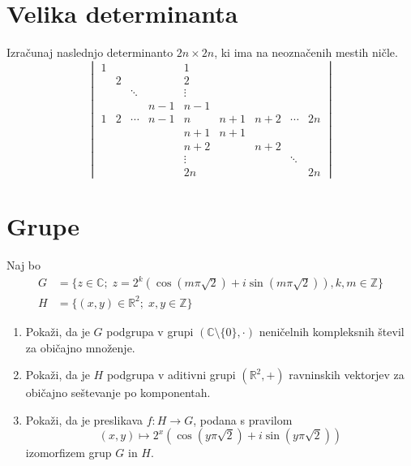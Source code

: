 \documentclass[a4paper,12pt]{article}
\begin{document}
\section*{Velika determinanta}

Izračunaj naslednjo determinanto \(2n \times 2n\), ki ima na neoznačenih mestih ničle.
\[
  \begin{vmatrix}
    1 &   &        &       & 1     &       &       &        &    \\
      & 2 &        &       & 2     &       &       &        &    \\
      &   & \ddots &       & \vdots &       &       &        &    \\
      &   &        & n-1   & n-1   &       &       &        &    \\
    1 & 2 & \cdots & n-1   & n     & n+1   & n+2   & \cdots & 2n \\
      &   &        &       & n+1   & n+1   &       &        &    \\
      &   &        &       & n+2   &       & n+2   &        &    \\
      &   &        &       & \vdots &       &       & \ddots &    \\
      &   &        &       & 2n    &       &       &        & 2n
  \end{vmatrix}
\]

\section*{Grupe}

Naj bo
\begin{align*}
  G &= \{z \in \mathbb{C};\; z = 2^k (\cos(m \pi \sqrt{2}) + i \sin(m \pi \sqrt{2})), k, m \in \mathbb{Z}\} \\
  H &= \{(x, y) \in \mathbb{R}^2;\; x, y \in \mathbb{Z}\}
\end{align*}
\begin{enumerate}
\item
Pokaži, da je \(G\) podgrupa v grupi \((\mathbb{C} \setminus \{0\}, \cdot)\)
neničelnih kompleksnih števil za običajno množenje.

\item
Pokaži, da je \(H\) podgrupa v aditivni grupi \((\mathbb{R}^2, +)\)
ravninskih vektorjev za običajno seštevanje po komponentah.

\item
Pokaži, da je preslikava \(f:H\to G\), podana s pravilom
\[
  (x, y) \mapsto 2^x (\cos(y \pi \sqrt{2}) + i \sin(y \pi \sqrt{2}))
\]
izomorfizem grup \(G\) in \(H\).
\end{enumerate}
\end{document}
